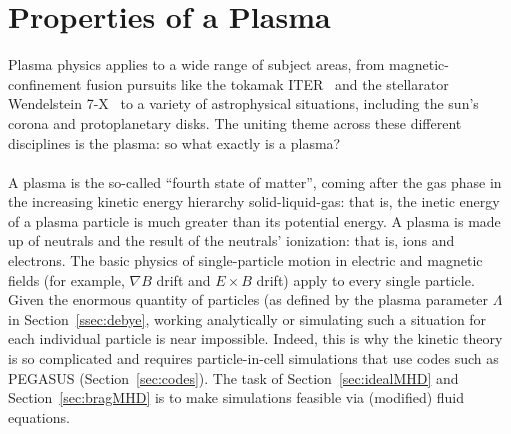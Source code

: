 \section{Properties of a Plasma} \label{sec:plasmaproperties}
Plasma physics applies to a wide range of subject areas, from magnetic-confinement fusion pursuits like the tokamak ITER~\cite{Janeschitz2001} and the stellarator Wendelstein 7-X~\cite{Grieger1993} to a variety of astrophysical situations, including the sun's corona and protoplanetary disks. The uniting theme across these different disciplines is the plasma: so what exactly is a plasma? \\
\\
A plasma is the so-called ``fourth state of matter'', coming after the gas phase in the increasing kinetic energy hierarchy solid-liquid-gas: that is, the inetic energy of a plasma particle is much greater than its potential energy. A plasma is made up of neutrals and the result of the neutrals' ionization: that is, ions and electrons. The basic physics of single-particle motion in electric and magnetic fields (for example, $\nabla B$ drift and $E\times B$ drift) apply to every single particle. Given the enormous quantity of particles (as defined by the plasma parameter $\Lambda$ in Section~\ref{ssec:debye}, working analytically or simulating such a situation for each individual particle is near impossible. Indeed, this is why the kinetic theory is so complicated and requires particle-in-cell simulations that use codes such as PEGASUS (Section~\ref{sec:codes}). The task of Section~\ref{sec:idealMHD} and Section~\ref{sec:bragMHD} is to make simulations feasible via (modified) fluid equations. 

